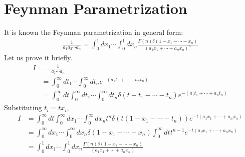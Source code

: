 \documentclass[fleqn]{article}
\begin{document}


\clearpage
\appendix
\section{Feynman Parametrization}
It is known the Feynman parametrization in general form:
\begin{align}
\frac{1}{a_{1}a_{2}\cdots a_{n}} = \int _0^1 dx_{1} \cdots \int_0^1 dx_{n} \frac{\Gamma(n) \delta(1-x_{1}- \cdots -x_{n})}{(a_{1}x_{1} + \cdots + a_{n}x_{n})^{n}}
\end{align}
Let us prove it briefly.
\begin{align}
I&= \frac{1}{a_{1} \cdots a_{n}} \nonumber \\
&= \int _{0}^{\infty} dt_{1} \cdots \int _{0}^{\infty} dt_{n} e^{-(a_{1}t_{1} + \cdots + a_{n} t_{n})} \nonumber \\
&= \int _{0}^{\infty} dt \int _{0}^{\infty} dt_{1} \cdots \int _{0}^{\infty} dt_{n} \delta (t- t_{1} - \cdots -t_{n}) e^{-(a_{1}t_{1} + \cdots + a_{n} t_{n})} \nonumber 
\end{align}
Substituting $t_{i} = tx_{i}$,
\begin{align}
I &= \int _{0}^{\infty} dt \int _{0}^{\infty}dx_{1} \cdots \int _{0}^{\infty}dx_{n} t^{n}\delta(t(1-x_{1} - \cdots -t_{n})) e^{-t(a_{1}x_{1} + \cdots + a_{n}x_{n})} \nonumber \\
&= \int _{0}^{\infty}dx_{1} \cdots \int _{0}^{\infty}dx_{n} \delta (1-x_{1} - \cdots -x_{n}) \int_{0} ^{\infty} dt t^{n-1}e^{-t(a_{1}x_{1} + \cdots + a_{n}x_{n})} \nonumber \\
&= \int _{0}^{1} dx_{1} \cdots \int_{0}^{1} dx_{n}\frac{\Gamma(n) \delta (1-x_{1} - \cdots - x_{n})}{(a_{1}x_{1}+ \cdots + a_{n}x_{n})}
\end{align}
\end{document}
